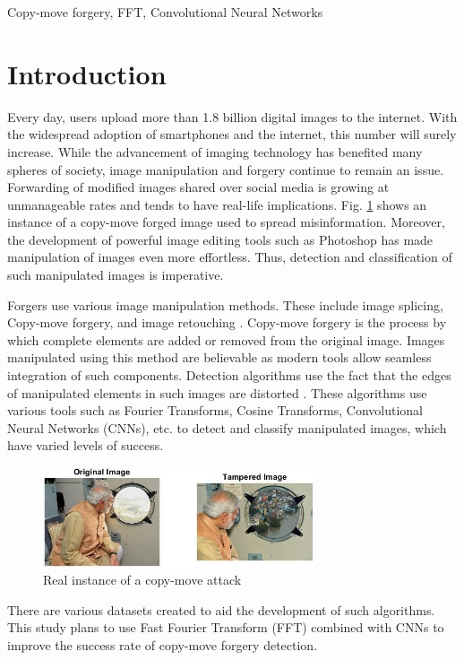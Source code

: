 \documentclass[conference]{IEEEtran}
\begin{document}
\begin{IEEEkeywords}
Copy-move forgery, FFT, Convolutional Neural Networks
\end{IEEEkeywords}

\section{Introduction}
Every day, users upload more than 1.8 billion digital images to the internet. With the widespread adoption of smartphones and the internet, this number will surely increase. While the advancement of imaging technology has benefited many spheres of society, image manipulation and forgery continue to remain an issue. Forwarding of modified images shared over social media is growing at unmanageable rates and tends to have real-life implications. Fig. \ref{modi} shows an instance of a copy-move forged image used to spread misinformation. Moreover, the development of powerful image editing tools such as Photoshop has made manipulation of images even more effortless. Thus, detection and classification of such manipulated images is imperative. 


Forgers use various image manipulation methods. These include image splicing, Copy-move forgery, and image retouching \cite{b1}. Copy-move forgery is the process by which complete elements are added or removed from the original image. Images manipulated using this method are believable as modern tools allow seamless integration of such components. Detection algorithms use the fact that the edges of manipulated elements in such images are distorted \cite{b2}. These algorithms use various tools such as Fourier Transforms, Cosine Transforms, Convolutional Neural Networks (CNNs), etc. \cite{b1} to detect and classify manipulated images, which have varied levels of success. 

\begin{figure}[htpb]
\centerline{\includegraphics[width=8cm]{modi.jpg}}
\caption{Real instance of a copy-move attack \cite{b14}}
\label{modi}
\end{figure}

There are various datasets created to aid the development of such algorithms. This study plans to use Fast Fourier Transform (FFT) \cite{b10} combined with CNNs to improve the success rate of copy-move forgery detection.
\end{document}
